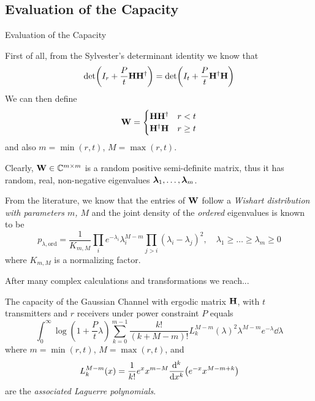 \subsection{Evaluation of the Capacity}
\begin{frame}[allowframebreaks]{Evaluation of the Capacity}

First of all, from the Sylvester's determinant identity we know that
$$\det(I_r + \frac{P}{t}\vb{H\ensuremath{H^\dagger}}) = \det(I_t + \frac{P}{t}\vb{\ensuremath{H^\dagger}H})$$
We can then define
\begin{equation*}
\vb{W}=\begin{cases}
\vb{H\ensuremath{H^\dagger}}	& r<t\\
\vb{\ensuremath{H^\dagger}H}	& r\geq t
\end{cases}
\end{equation*}
and also $m=\min(r,t)$, $M=\max(r,t)$.

\medskip
Clearly, $\vb{W}\in \mathbb{C}^{m\times m}$ is a random positive semi-definite matrix, thus it has random, real, non-negative eigenvalues $\vb*{\lambda}_1,\ldots,\vb*{\lambda}_m$.

\framebreak

From the literature, we know that the entries of $\vb{W}$ follow a \textit{Wishart distribution with parameters $m$, $M$} and the joint density of the \textit{ordered} eigenvalues is known to be \cite{james1964}
$$p_{\lambda,\text{ord}} = 	\frac{1}{K_{m,M}}
\prod_i e^{-\lambda_i}\lambda_i^{M-m}
\prod_{j>i} (\lambda_i-\lambda_j)^2,
\quad \lambda_1\geq \ldots \geq \lambda_m \geq 0 $$
where $K_{m,M}$ is a normalizing factor.

\medskip
After many complex calculations and transformations we reach...

\framebreak

\begin{theorem}
	The capacity of the Gaussian Channel with ergodic matrix $\vb{H}$, with $t$ transmitters and $r$ receivers under power constraint $P$ equals
	\begin{equation}\label{eq:capacity_ergodic}
	\int_0^\infty \log(1+\frac{P}{t}\lambda)
	\sum_{k=0}^{m-1} \frac{k!}{(k+M-m)!}
	L_k^{M-m}(\lambda)^2
	\lambda^{M-m} e^{-\lambda}
	\dd{\lambda}
	\end{equation}
	where $m=\min(r,t)$, $M=\max(r,t)$, and
	$$L_k^{M-m}(x) = \frac{1}{k!}
	e^x x^{m-M}
	\dv[k]{}{x}
	\qty(e^{-x}x^{M-m+k})$$
	are the \textit{associated Laguerre polynomials}.
\end{theorem}

\end{frame}

